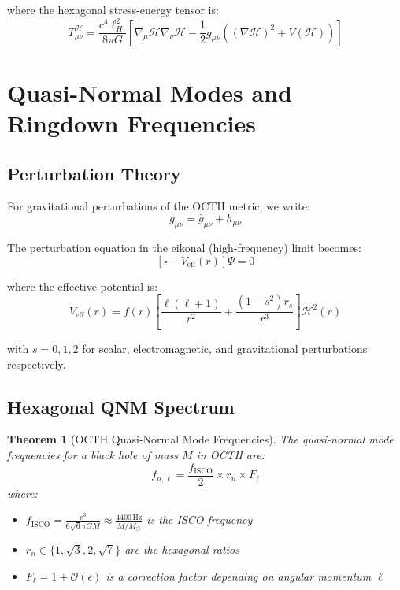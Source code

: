 \documentclass[12pt,a4paper]{article}
\newtheorem{theorem}{Theorem}
\begin{document}
where the hexagonal stress-energy tensor is:
\begin{equation}
    T_{\mu\nu}^{\mathcal{H}} = \frac{c^4\ell_H^2}{8\pi G}\left[\nabla_\mu\mathcal{H}\nabla_\nu\mathcal{H} - \frac{1}{2}g_{\mu\nu}\left((\nabla\mathcal{H})^2 + V(\mathcal{H})\right)\right]
\end{equation}

\section{Quasi-Normal Modes and Ringdown Frequencies}

\subsection{Perturbation Theory}

For gravitational perturbations of the OCTH metric, we write:
\begin{equation}
    g_{\mu\nu} = \bar{g}_{\mu\nu} + h_{\mu\nu}
\end{equation}

The perturbation equation in the eikonal (high-frequency) limit becomes:
\begin{equation}
    \left[\square - V_{\text{eff}}(r)\right]\Psi = 0
\end{equation}

where the effective potential is:
\begin{equation}
    V_{\text{eff}}(r) = f(r)\left[\frac{\ell(\ell+1)}{r^2} + \frac{(1-s^2)r_s}{r^3}\right]\mathcal{H}^2(r)
\end{equation}

with $s = 0, 1, 2$ for scalar, electromagnetic, and gravitational perturbations respectively.

\subsection{Hexagonal QNM Spectrum}

\begin{theorem}[OCTH Quasi-Normal Mode Frequencies]
The quasi-normal mode frequencies for a black hole of mass $M$ in OCTH are:
\begin{equation}
    \boxed{f_{n,\ell} = \frac{f_{\text{ISCO}}}{2} \times r_n \times F_\ell}
\end{equation}
where:
\begin{itemize}
    \item $f_{\text{ISCO}} = \frac{c^3}{6\sqrt{6}\pi GM} \approx \frac{4400\,\text{Hz}}{M/M_\odot}$ is the ISCO frequency
    \item $r_n \in \{1, \sqrt{3}, 2, \sqrt{7}\}$ are the hexagonal ratios
    \item $F_\ell = 1 + \mathcal{O}(\epsilon)$ is a correction factor depending on angular momentum $\ell$
\end{itemize}
\end{theorem}
\end{document}
